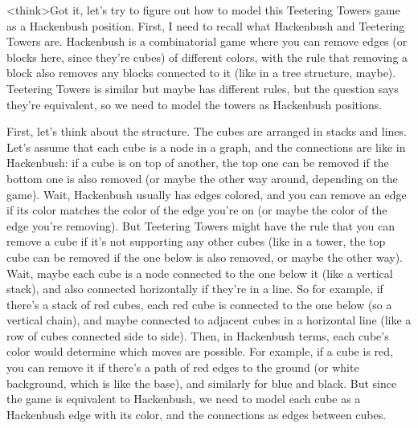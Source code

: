 <think>Got it, let's try to figure out how to model this Teetering Towers game as a Hackenbush position. First, I need to recall what Hackenbush and Teetering Towers are. Hackenbush is a combinatorial game where you can remove edges (or blocks here, since they're cubes) of different colors, with the rule that removing a block also removes any blocks connected to it (like in a tree structure, maybe). Teetering Towers is similar but maybe has different rules, but the question says they're equivalent, so we need to model the towers as Hackenbush positions.

First, let's think about the structure. The cubes are arranged in stacks and lines. Let's assume that each cube is a node in a graph, and the connections are like in Hackenbush: if a cube is on top of another, the top one can be removed if the bottom one is also removed (or maybe the other way around, depending on the game). Wait, Hackenbush usually has edges colored, and you can remove an edge if its color matches the color of the edge you're on (or maybe the color of the edge you're removing). But Teetering Towers might have the rule that you can remove a cube if it's not supporting any other cubes (like in a tower, the top cube can be removed if the one below is also removed, or maybe the other way). Wait, maybe each cube is a node connected to the one below it (like a vertical stack), and also connected horizontally if they're in a line. So for example, if there's a stack of red cubes, each red cube is connected to the one below (so a vertical chain), and maybe connected to adjacent cubes in a horizontal line (like a row of cubes connected side to side). Then, in Hackenbush terms, each cube's color would determine which moves are possible. For example, if a cube is red, you can remove it if there's a path of red edges to the ground (or white background, which is like the base), and similarly for blue and black. But since the game is equivalent to Hackenbush, we need to model each cube as a Hackenbush edge with its color, and the connections as edges between cubes.

